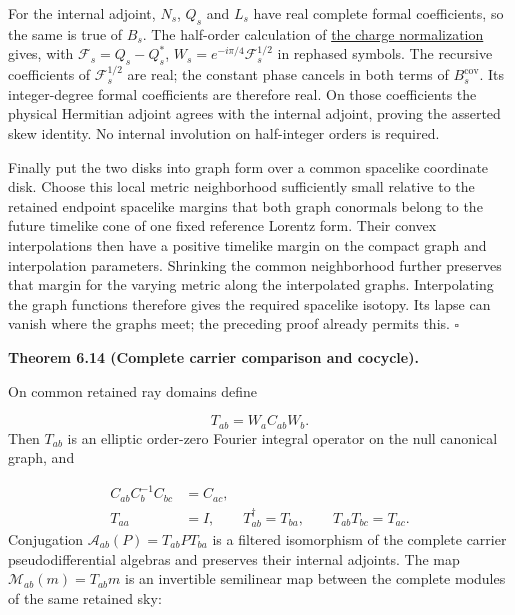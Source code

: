 \documentclass[
  english,
  11pt,
  reqno]{amsart}
\makeatletter
\newcommand{\pandocstatementheading}[1]{%
  \par\addpenalty{\@beginparpenalty}%
  \addvspace{.5\baselineskip plus .2\baselineskip minus .2\baselineskip}%
  {\normalfont\bfseries #1\par}%
  \nobreak\@afterindenttrue\@afterheading
}
\makeatother
\begin{document}
For the internal adjoint, \(N_s\), \(Q_s\) and \(L_s\) have real
complete formal coefficients, so the same is true of \(B_s\). The
half-order calculation of
\hyperref[prop:online-wave-charge-normalization]{the charge
normalization} gives, with \(\mathcal F_s=Q_s-Q_s^*\),
\(W_s=e^{-i\pi/4}\mathcal F_s^{1/2}\) in rephased symbols. The recursive
coefficients of \(\mathcal F_s^{1/2}\) are real; the constant phase
cancels in both terms of \(B_s^{\mathrm{cov}}\). Its integer-degree
formal coefficients are therefore real. On those coefficients the
physical Hermitian adjoint agrees with the internal adjoint, proving the
asserted skew identity. No internal involution on half-integer orders is
required.

Finally put the two disks into graph form over a common spacelike
coordinate disk. Choose this local metric neighborhood sufficiently
small relative to the retained endpoint spacelike margins that both
graph conormals belong to the future timelike cone of one fixed
reference Lorentz form. Their convex interpolations then have a positive
timelike margin on the compact graph and interpolation parameters.
Shrinking the common neighborhood further preserves that margin for the
varying metric along the interpolated graphs. Interpolating the graph
functions therefore gives the required spacelike isotopy. Its lapse can
vanish where the graphs meet; the preceding proof already permits this.
\hfill\(\square\)

\pandocstatementheading{\leavevmode{}\label{thm:online-wave-carrier-cocycle}Theorem 6.14 (Complete carrier comparison and cocycle).}

On common retained ray domains define

\label{eq:online-wave-normalized-carrier-map} \[
T_{ab}=W_aC_{ab}W_b.
\] Then \(T_{ab}\) is an elliptic order-zero Fourier integral operator
on the null canonical graph, and

\label{eq:online-wave-carrier-complete-cocycle} \[
\begin{aligned}
C_{ab}C_b^{-1}C_{bc}&=C_{ac},\\
T_{aa}&=I,\qquad T_{ab}^\dagger=T_{ba},\qquad
T_{ab}T_{bc}=T_{ac}.
\end{aligned}
\] Conjugation \(\mathcal A_{ab}(P)=T_{ab}PT_{ba}\) is a filtered
isomorphism of the complete carrier pseudodifferential algebras and
preserves their internal adjoints. The map
\(\mathcal M_{ab}(m)=T_{ab}m\) is an invertible semilinear map between
the complete modules of the same retained sky:
\end{document}
